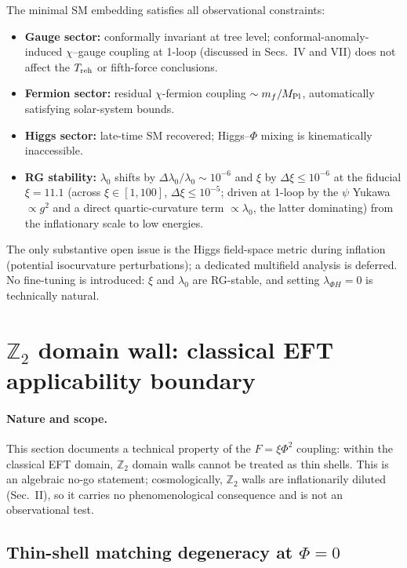 \documentclass[pdflatex,sn-mathphys-num]{sn-jnl}
\newcommand{\MP}{M_{\rm Pl}}
\newcommand{\Ztwo}{\mathbb{Z}_2}
\theoremstyle{thmstyleone}
\begin{document}
The minimal SM embedding satisfies all observational constraints:
\begin{itemize}
\item \textbf{Gauge sector:} conformally invariant at tree level; conformal-anomaly-induced $\chi$--gauge coupling at 1-loop (discussed in Secs.~IV and VII) does not affect the $T_{\rm reh}$ or fifth-force conclusions.
\item \textbf{Fermion sector:} residual $\chi$-fermion coupling $\sim m_f/\MP$, automatically satisfying solar-system bounds.
\item \textbf{Higgs sector:} late-time SM recovered; Higgs--$\Phi$ mixing is kinematically inaccessible.
\item \textbf{RG stability:} $\lambda_0$ shifts by $\Delta\lambda_0/\lambda_0\sim10^{-6}$ and $\xi$ by $\Delta\xi\leq10^{-6}$ at the fiducial $\xi=11.1$ (across $\xi\in[1,100]$, $\Delta\xi\leq10^{-5}$; driven at 1-loop by the $\psi$ Yukawa $\propto g^2$ and a direct quartic-curvature term $\propto\lambda_0$, the latter dominating) from the inflationary scale to low energies.
\end{itemize}
The only substantive open issue is the Higgs field-space metric during inflation (potential isocurvature perturbations); a dedicated multifield analysis is deferred. No fine-tuning is introduced: $\xi$ and $\lambda_0$ are RG-stable, and setting $\lambda_{\Phi H}=0$ is technically natural.

\section{$\Ztwo$ domain wall: classical EFT applicability boundary}

\paragraph{Nature and scope.} This section documents a technical property of the $F=\xi\Phi^2$ coupling: within the classical EFT domain, $\Ztwo$ domain walls cannot be treated as thin shells. This is an algebraic no-go statement; cosmologically, $\Ztwo$ walls are inflationarily diluted (Sec.~II), so it carries no phenomenological consequence and is not an observational test.

\subsection{Thin-shell matching degeneracy at $\Phi=0$}
\end{document}
